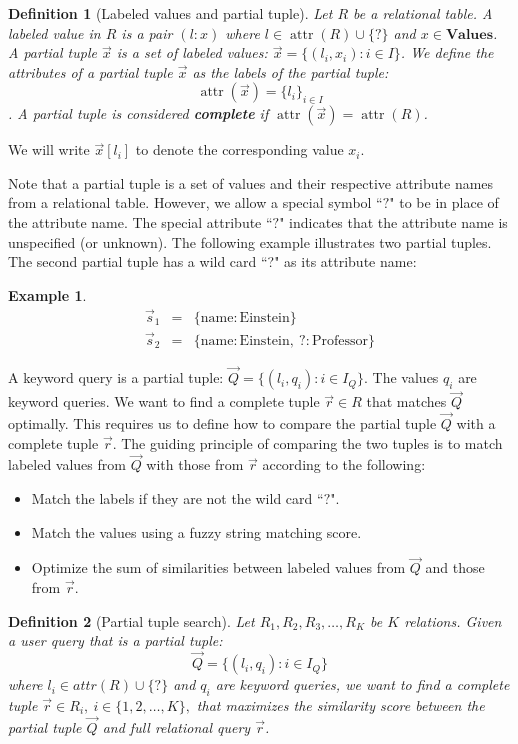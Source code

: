 \documentclass[conference]{IEEEtran}
\newtheorem{definition}{Definition}
\newtheorem{example}{Example}
\newcommand{\Attr}{\operatorname{attr}}
\newcommand{\Values}{\mathbf{Values}}
\begin{document}
\begin{definition}[Labeled values and partial tuple]
Let $R$ be a relational table.  A labeled value in $R$ is a pair $(l:x)$ where 
$l\in\Attr(R)\cup\{?\}$ and $x\in\Values$.  A partial tuple $\vec{x}$ is a set
of labeled values: $\vec x = \{(l_i, x_i): i\in I\}$.  We define the
attributes of a partial tuple $\vec x$ as the labels of the partial
tuple:
$$\Attr(\vec x) = \{l_i\}_{i\in I}$$.
A partial tuple is considered {\bf\em complete} if $\Attr(\vec x) = \Attr(R)$.
\end{definition}

We will write $\vec x[l_i]$ to denote the corresponding value $x_i$.

Note that a partial tuple is a set of values and their respective attribute
names from a relational table.  However, we allow a special symbol ``$?$" to be
in place of the attribute name.  The special attribute ``$?$" indicates that
the attribute name is unspecified (or unknown). The following example
illustrates two partial tuples. The second partial tuple has a wild card ``?"
as its attribute name:

\begin{example}
\begin{eqnarray*}
\vec s_1 &=& \{\mathrm{name}:\mathrm{Einstein}\} \\
\vec s_2 &=& \{\mathrm{name}:\mathrm{Einstein},\ \mathrm{?}: \mathrm{Professor}\}
\end{eqnarray*}
\end{example}

A keyword query is a partial tuple: $\vec Q = \{(l_i, q_i): i\in I_Q\}$.  The
values $q_i$ are keyword queries.
We want to find a complete tuple $\vec r \in R$ that matches $\vec Q$
optimally.  This requires us to define how to compare the partial tuple $\vec
Q$ with a complete tuple $\vec r$.  The guiding principle of comparing the two
tuples is to match labeled values from $\vec Q$ with those from $\vec r$
according to the following:
\begin{itemize}
    \item Match the labels if they are not the wild card ``$?$".
    \item Match the values using a fuzzy string matching score.
    \item Optimize the sum of similarities between labeled values from $\vec Q$ and those from $\vec r$.
\end{itemize}


\begin{definition}[Partial tuple search]
Let $R_1, R_2, R_3, \dots, R_K$ be $K$ relations. 
Given a user query that is a partial tuple: $$\vec Q = \{(l_i, q_i): i\in I_Q\}$$ 
where $l_i \in attr(R)\cup\{?\}$ and $q_i$ are keyword queries, 
we want to find a complete tuple $\vec r \in R_i,\ i\in\{1, 2, \dots, K\},$ that maximizes the similarity score
between the partial tuple $\Vec Q$ and full relational query $\vec r$.
\end{definition}
\end{document}
